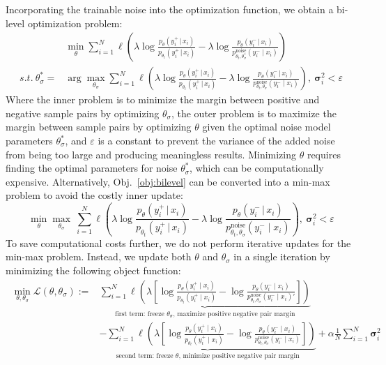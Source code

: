 Incorporating the trainable noise into the optimization function, we obtain a bi-level optimization problem:
\begin{align}~\label{obj:bilevel}
&\min_{\theta} \sum_{i=1}^N \ell \left( \lambda \log \frac{p_{\theta}(y^+_i \,|\, x_i)}{p_{\theta_t}(y^+_i \,|\, x_i)} - \lambda \log \frac{p_{\theta}(y^-_i \,|\, x_i)}{p_{\theta_t,\theta^{*}_{\sigma}}^{\text{noise}}(y_i^- \mid x_i)} \right) \nonumber \\
s.t.\ \theta_{\sigma}^* = &\arg\max_{\theta_{\sigma}}\sum_{i=1}^N \ell \left( \lambda \log \frac{p_{\theta}(y^+_i \,|\, x_i)}{p_{\theta_t}(y^+_i \,|\, x_i)} 
    - \lambda \log \frac{p_{\theta}(y^-_i \,|\, x_i)}{p_{\theta_t,\theta_{\sigma}}^{\text{noise}}(y_i^- \mid x_i)} \right),\ \boldsymbol{\sigma}^2_i < \varepsilon
\end{align}
Where the inner problem is to minimize the margin between positive and negative sample pairs by optimizing $\theta_{\sigma}$, the outer problem is to maximize the margin between sample pairs by optimizing $\theta$ given the optimal noise model parameters $\theta_{\sigma}^*$, and $\varepsilon$ is a constant to prevent the variance of the added noise from being too large and producing meaningless results.  Minimizing $\theta$ requires finding the optimal parameters  for noise $\theta_{\sigma}^*$, which can be computationally expensive. Alternatively, Obj.~\ref{obj:bilevel} can be converted into a min-max problem to avoid the costly inner update: 
\begin{equation}
\min_{\theta}\max_{\theta_{\sigma}}\ \sum_{i=1}^N \ell \left( \lambda \log \frac{p_{\theta}(y^+_i \,|\, x_i)}{p_{\theta_t}(y^+_i \,|\, x_i)} 
    - \lambda \log \frac{p_{\theta}(y^-_i \,|\, x_i)}{p_{\theta_t,\theta_{\sigma}}^{\text{noise}}(y_i^- \mid x_i)} \right),\ \boldsymbol{\sigma}^2_i < \varepsilon
\end{equation}
To save computational costs further, we do not perform iterative updates for the min-max problem. Instead, we update both $\theta$ and $\theta_{\sigma}$ in a single iteration by minimizing the following object function:
\begin{align}~\label{obj:final}
\min_{\theta, \theta_{\sigma}} \mathcal{L}(\theta, \theta_{\sigma}):= 
& \underbrace{\sum_{i=1}^N \ell\left( \lambda \left[ \log \frac{p_{\theta}(y_i^+ \mid x_i)}{p_{\theta_t}(y_i^+ \mid x_i)} - \log \frac{p_{\theta}(y_i^- \mid x_i)}{p_{\theta_t,\theta_{\sigma}}^{\text{noise}}(y_i^- \mid x_i)'} \right] \right)}_{\text{first term: freeze $\theta_{\sigma}$, maximize positive negative pair margin}} \nonumber \\
& \underbrace{- \sum_{i=1}^N \ell\left( \lambda \left[ \log \frac{p_{\theta}(y_i^+ \mid x_i)}{p_{\theta_t}(y_i^+ \mid x_i)} - \log \frac{p_{\theta}(y_i^- \mid x_i)}{p_{\theta_t,\theta_{\sigma}}^{\text{noise}}(y_i^- \mid x_i)} \right] \right)}_{\text{second term: freeze $\theta$, minimize positive negative pair margin}}
+ \alpha \frac{1}{N}\sum_{i=1}^N \boldsymbol{\sigma}_i^2 
\end{align}
